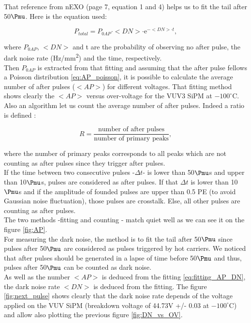 \documentclass[a4paper, 11pt]{report}%
\begin{document}
  That reference from nEXO \cite{ref:charac_SiPM_nEXO} (page 7, equation 1 and 4) helps us to fit the tail after 50$\Pmu$. 
  Here is the equation used:
  
  \begin{equation} \label{eq:fitting_AP_DN}
    P_{total} = P_{0AP}\cdot <DN>\cdot\mathrm{e}^{-<DN>\cdot t},
  \end{equation}

  where $P_{0AP}$, $<DN>$ and t are the probability of observing no after pulse, the dark noise rate (Hz/mm\textsuperscript{2})
  and the 
  time, respectively.\\
  Then $P_{0AP}$ is extracted from that fitting and assuming that the after pulse fellows a Poisson distribution 
  \ref{eq:AP_poisson}, 
  it is possible to calculate the average number of after pulses ($<AP>$) for different voltages. That fitting method shows 
  clearly the $<AP>$ versus over-voltage for the VUV3 SiPM at $-100^{\circ}$C.\\
  Also an algorithm let us count the average number of after pulses. Indeed a ratio is defined : 
  
  \begin{equation} \label{eq:ratio}
    R = \frac{\textrm{number of after pulses}}{\textrm{number of primary peaks}},
  \end{equation}
  
  where the number of primary peaks corresponds to all peaks which are not counting as after pulses since they trigger
  after pulses.\\
  If the time between two consecutive pulses 
  -$\Delta t$- is lower than 50$\Pmu$s and
  upper than 10$\Pmu$s, pulses are considered as after pulses. If that $\Delta t$ is lower than 10$\Pmu$s and 
  if the amplitude of founded
  pulses are upper than 0.5 PE (to avoid Gaussian noise fluctuation), those pulses are crosstalk. Else, all other pulses 
  are counting as after pulses.\\
  The two methods -fitting and counting - match quiet well as we can see it on the figure \ref{fig:AP}.
  \\
  
  For measuring the dark noise, the method is to fit the tail after 50$\Pmu$ since pulses after 50$\Pmu$ are considered as pulses
  triggered by hot carriers. We noticed that after pulses should be generated in a lapse of time before
  50$\Pmu$ and thus, pulses after 50$\Pmu$ can be counted as dark noise.\\
  As well as the number $<AP>$ is deduced from the fitting \ref{eq:fitting_AP_DN}, the dark noise rate $<DN>$ is 
  deduced from the fitting. The figure \ref{fig:next_pulse} shows clearly that the dark noise rate depends of the voltage
  applied on the VUV SiPM (breakdown voltage of 44.73V +/- 0.03 at $-100^{\circ}$C) and allow also plotting the previous figure 
  \ref{fig:DN_vs_OV}. 
  \\
  
\end{document}
